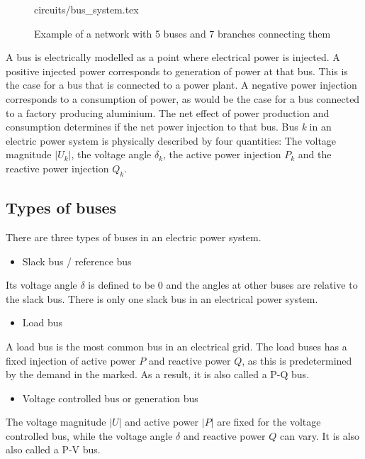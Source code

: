 \documentclass[class=book, crop=false]{standalone}
\begin{document}
\begin{figure}[ht!]
    \center
    {circuits/bus_system.tex}
    \caption[size = 9]
    {Example of a network with 5 buses and 7 branches connecting them}\label{fig:theory:bus_system}
\end{figure}
A bus is electrically modelled as a point where electrical power is injected. A positive injected power corresponds to generation of power at that bus. This is the case for a bus that is connected to a power plant. A negative power injection corresponds to a consumption of power, as would be the case for a bus connected to a factory producing aluminium. The net effect of power production and consumption determines if the net power injection to that bus. Bus \textit{k} in an electric power system is physically described by four quantities: The voltage magnitude $|U_{k}|$, the voltage angle $\delta_{k}$, the active power injection $P_{k}$ and the reactive power injection $Q_{k}$.

\subsection{Types of buses}\label{theory:subsection:bus_types}

There are three types of buses in an electric power system\cite{opf_intro}.

\begin{itemize}
  \item Slack bus / reference bus
\end{itemize}
Its voltage angle $\delta$ is defined to be 0 and the angles at other buses are relative to the slack bus. There is only one slack bus in an electrical power system.

\begin{itemize}
  \item Load bus
\end{itemize}
A load bus is the most common bus in an electrical grid. The load buses has a fixed injection of active power $P$ and reactive power $Q$, as this is predetermined by the demand in the marked. As a result, it is also called a P-Q bus.

\begin{itemize}
  \item Voltage controlled bus or generation bus
\end{itemize}
The voltage magnitude $|U|$ and active power $|P|$ are fixed for the voltage controlled bus, while the voltage angle $\delta$ and reactive power $Q$ can vary. It is also also called a P-V bus. 
\end{document}
